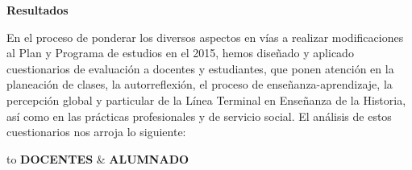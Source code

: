 \medskip
\textbf{Resultados}

En el proceso de ponderar los diversos aspectos en vías a realizar modificaciones al Plan y Programa de estudios en el
2015, hemos diseñado y aplicado cuestionarios de evaluación a docentes y estudiantes, que ponen atención en la planeación de clases, la autorreflexión, el proceso de enseñanza-aprendizaje, la percepción global y particular de la Línea Terminal en Enseñanza de la Historia, así como en las prácticas profesionales y de servicio social. El análisis de estos cuestionarios nos arroja lo siguiente:

\bigskip
\begin{center}
\begin{tiny}       %
\tabulinesep=1.5mm
\begin{longtabu*} to \textwidth {X[5,l,p]|X[5,l,p]}
    \toprule
{}\textbf{DOCENTES} & \textbf{ALUMNADO}\\ 
    \midrule
  \endfirsthead%

\end{longtabu*}
\end{tiny}
\end{center}
